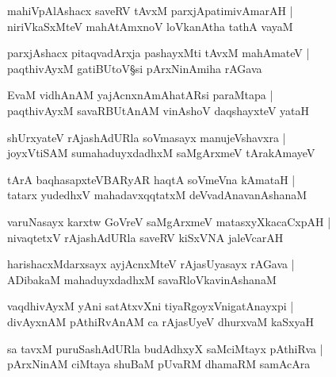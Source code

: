 \begin{shloka}
mahiVpAlAshacx saveRV tAvxM parxjApatimivAmarAH |\\
niriVkaSxMteV mahAtAmxnoV loVkanAtha tathA vayaM 
\end{shloka}

\begin{shloka}
parxjAshacx pitaqvadArxja\R{} pashayxMti tAvxM mahAmateV |\\
paqthivAyxM gatiBUtoV\S si pArxNinAmiha rAGava
\end{shloka}

\begin{shloka}
EvaM vidhAnAM yajAcnxnAmAhatARsi paraMtapa |\\
paqthivAyxM savaRBUtAnAM vinAshoV daqshayxteV yataH 
\end{shloka}

\begin{shloka}
shUrxyateV rAjashAdURla soVmasayx manujeVshavxra |\\
joyxVtiSAM sumahaduyxdadhxM saMgArxmeV tArakAmayeV 
\end{shloka}

\begin{shloka}
tArA baqhasapxteVBARyAR haqtA soVmeVna kAmataH |\\
tatarx yudedhxV mahadavxqqtatxM deVvadAnavanAshanaM 
\end{shloka}

\begin{shloka}
varuNasayx karxtw GoVreV saMgArxmeV matasxyXkacaCxpAH |\\
nivaqtetxV rAjashAdURla saveRV kiSxVNA jaleVcarAH
\end{shloka}

\begin{shloka}
harishacxMdarxsayx ayjAcnxMteV rAjasUyasayx rAGava |\\
ADibakaM mahaduyxdadhxM savaRloVkavinAshanaM 
\end{shloka}

\begin{shloka}
vaqdhivAyxM yAni satAtxvXni tiyaRgoyxVnigatAnayxpi |\\
divAyxnAM pAthiRvAnAM ca rAjasUyeV dhurxvaM kaSxyaH
\end{shloka}

\begin{shloka}
sa tavxM puruSashAdURla budAdhxyX saMciMtayx pAthiRva |\\
pArxNinAM ciMtaya shuBaM pUvaRM dhamaRM samAcAra
\end{shloka}

